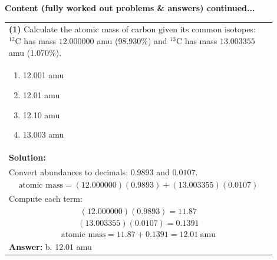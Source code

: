 \documentclass{article}
\begin{document}
\newpage
\noindent
{\large\textbf{Content (fully worked out problems \& answers) continued...}}\\[0.2em]
\vspace{0.2cm}

\begin{tabular}{|p{0.9\linewidth}|}
\hline
\vspace{0.2cm}
\textbf{(1)} Calculate the atomic mass of carbon given its common isotopes: $^{12}\text{C}$ has mass $12.000000$ amu (98.930\%) and $^{13}\text{C}$ has mass $13.003355$ amu (1.070\%). \\
\begin{minipage}[t]{0.85\linewidth}
\begin{enumerate}[label=\alph*.]
\item 12.001 amu
\item 12.01 amu
\item 12.10 amu
\item 13.003 amu
\end{enumerate}
\end{minipage}\\
\hline
\vspace{0.2cm}
\textbf{Solution:} \\
Convert abundances to decimals: $0.9893$ and $0.0107$. \\

\[
\text{atomic mass} = (12.000000)(0.9893)+(13.003355)(0.0107)
\] \\
Compute each term: \\
\[
(12.000000)(0.9893)=11.87
\] \\
\[
(13.003355)(0.0107)=0.1391
\] \\
\[
\text{atomic mass}=11.87+0.1391=12.01~\text{amu}
\] \\ 
\hline
\vspace{0.2cm}
\textbf{Answer:} b. 12.01 amu\\
\hline
\end{tabular}
\end{document}
